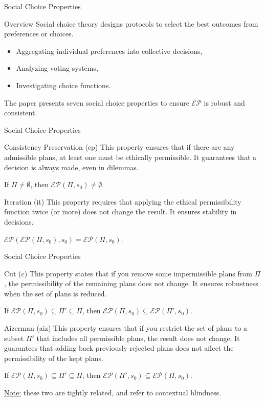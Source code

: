 \documentclass[compress,xcolor=table]{beamer}
\begin{document}
\begin{frame}{Social Choice Properties}
    \begin{block}{Overview}
    Social choice theory designs protocols to select the best outcomes from preferences or choices.  
    \begin{itemize}
        \item Aggregating individual preferences into collective decisions,
        \item Analyzing voting systems,
        \item Investigating choice functions.
    \end{itemize}  
    The paper presents seven social choice properties to ensure \(\mathcal{EP}\) is robust and consistent.
    \end{block}
\end{frame}

\begin{frame}{Social Choice Properties}
    \begin{block}{Consistency Preservation (cp)}
        This property ensures that if there are any admissible plans, at least one must be ethically permissible. It guarantees that a decision is always made, even in dilemmas.
    \end{block}
    If \(\Pi \neq \emptyset\), then \(\mathcal{EP}(\Pi, s_0) \neq \emptyset\).
    \pause
    \begin{block}{Iteration (it)}
        This property requires that applying the ethical permissibility function twice (or more) does not change the result. It ensures stability in decisions.
    \end{block}
    \(\mathcal{EP}(\mathcal{EP}(\Pi, s_0), s_0) = \mathcal{EP}(\Pi, s_0)\).
\end{frame}


\begin{frame}{Social Choice Properties}
    \begin{block}{Cut (c)}
        This property states that if you remove some impermissible plans from \(\Pi\), the permissibility of the remaining plans does not change. It ensures robustness when the set of plans is reduced.
    \end{block}
    If \(\mathcal{EP}(\Pi, s_0) \subseteq \Pi' \subseteq \Pi\), then \(\mathcal{EP}(\Pi, s_0) \subseteq \mathcal{EP}(\Pi', s_0)\).
    \pause
    \begin{block}{Aizerman (aiz)}
        This property ensures that if you restrict the set of plans to a subset \(\Pi'\) that includes all permissible plans, the result does not change. It guarantees that adding back previously rejected plans does not affect the permissibility of the kept plans.
    \end{block}
    If \(\mathcal{EP}(\Pi, s_0) \subseteq \Pi' \subseteq \Pi\), then \(\mathcal{EP}(\Pi', s_0) \subseteq \mathcal{EP}(\Pi, s_0)\).

    \tiny
    \underline{Note:} these two are tightly related, and refer to contextual blindness.
\end{frame}
\end{document}
